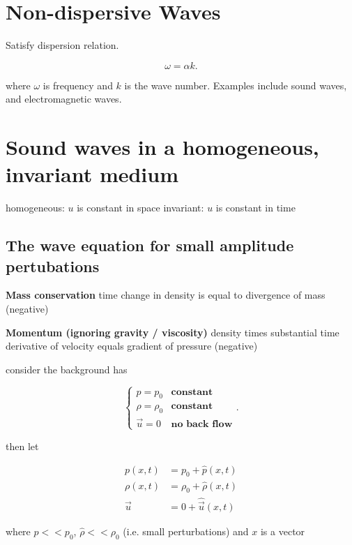 
\subsectionfont{\fontsize{10}{10}\selectfont}

\section{Non-dispersive Waves}%

Satisfy dispersion relation.

\[
\omega = \alpha k
.\] 

where $ \omega$ is frequency and $k$ is the wave number. Examples include sound
waves, and electromagnetic waves.

\section{Sound waves in a homogeneous, invariant medium}%

homogeneous: $u$ is constant in space
invariant: $u$ is constant in time

\subsection{The wave equation for small amplitude pertubations} 

\textbf{Mass conservation} 
time change in density is equal to divergence of mass (negative)

\textbf{Momentum (ignoring gravity / viscosity)} 
density times substantial time derivative of velocity equals gradient of
pressure (negative)

consider the background has

\[
\begin{cases}
  p = p_{0} & \textbf{constant} \\
  \rho = \rho_{0} & \textbf{constant} \\
  \vec{u} = 0 & \textbf{no back flow} 
\end{cases}
.\] 

then let

\begin{align*}
  p(x,t) &= p_0 + \hat p(x,t) \\
  \rho(x,t) &= \rho_0+ \hat \rho(x,t) \\
  \vec{u} &= 0 + \hat \vec{u}(x,t)
\end{align*}

where $\hat p << p_0$, $\hat \rho << \rho_0$ (i.e. small perturbations) and $x$ is a vector

